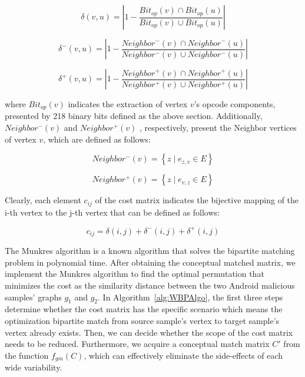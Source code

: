 \begin{equation}
        \label{eq:hostop}
 \delta \left ( v, u \right ) = \left | 1 - \frac{Bit_{op}\left ( v \right ) \cap Bit_{op}\left ( u \right )}{Bit_{op}\left ( v \right ) \cup  Bit_{op}\left ( u \right )} \right |
  \end{equation}
 
 \begin{equation}
        \label{eq:inop}
\delta^{-} \left ( v, u \right ) = \left | 1 - \frac{Neighbor^{-}\left ( v \right ) \cap Neighbor^{-}\left ( u \right )}{Neighbor^{-}\left ( v \right ) \cup  Neighbor^{-}\left ( u \right )} \right |
 \end{equation}
 
 \begin{equation}
        \label{eq:outop}
\delta^{+} \left ( v, u \right ) = \left | 1 - \frac{Neighbor^{+}\left ( v \right ) \cap Neighbor^{+}\left ( u \right )}{Neighbor^{+}\left ( v \right ) \cup  Neighbor^{+}\left ( u \right )} \right |
 \end{equation}
  
 where $Bit_{op}\left ( v \right )$ indicates the extraction of vertex $v$'s opcode components, presented by 218 binary bits defined as the above section. Additionally, $Neighbor^{-}\left ( v \right )$ and $Neighbor^{+}\left ( v \right )$ , respectively, present the Neighbor vertices of vertex $v$, which are defined as follows:
 
 \begin{equation}
        \label{eq:indegree}
Neighbor^{-}\left ( v \right ) = \left \{ z \mid e_{z,v} \in E \right \}
  \end{equation}
  
  \begin{equation}
        \label{eq:outdegree}
 Neighbor^{+}\left ( v \right ) = \left \{ z \mid e_{v,z} \in E \right \}
  \end{equation}
   
 Clearly, each element $c_{ij}$ of the cost matrix indicates the bijective mapping of the i-th vertex to the j-th vertex that can be defined as follows:
  
  \begin{equation}
        \label{eq:cost_element}
 c_{ij} = \delta \left ( i, j \right ) + \delta^{-} \left ( i, j \right ) + \delta^{+} \left ( i, j \right )
   \end{equation}

The Munkres algorithm \cite{p:Munkres57} \cite{p:Kuhn56} is a known algorithm that solves the bipartite matching problem in polynomial time. After obtaining the conceptual matched matrix,  we implement the Munkres algorithm to find the optimal permutation that minimizes the cost as the similarity distance between the two Android malicious samples' graphs $g_{1}$ and $g_{2}$. In Algorithm~\ref{alg:WBPAlgo}, the first three steps determine whether the cost matrix has the specific scenario which means the optimization bipartite match from source sample's vertex to target sample's vertex already exists. Then, we can decide whether the scope of the cost matrix needs to be reduced. Furthermore, we acquire a conceptual match matrix $C'$ from the function $f_{gm}(C)$, which can effectively eliminate the side-effects of each wide variability.
